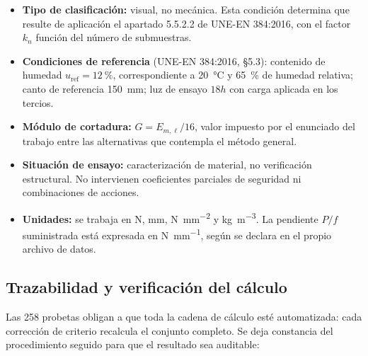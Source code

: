\documentclass[11pt,a4paper]{article}
\newcommand{\Eml}{E_{m,\ell}}
\newcommand{\uref}{u_{\mathrm{ref}}}
\begin{document}
\begin{itemize}
  \item \textbf{Tipo de clasificación:} visual, no mecánica. Esta condición determina
        que resulte de aplicación el apartado 5.5.2.2 de UNE-EN 384:2016, con el factor
        $k_{n}$ función del número de submuestras.
  \item \textbf{Condiciones de referencia} (UNE-EN 384:2016, \S5.3): contenido de
        humedad $\uref = \SI{12}{\percent}$, correspondiente a \SI{20}{\celsius} y
        \SI{65}{\percent} de humedad relativa; canto de referencia
        \SI{150}{\milli\meter}; luz de ensayo $18h$ con carga aplicada en los tercios.
  \item \textbf{Módulo de cortadura:} $G = \Eml/16$, valor impuesto por el enunciado
        del trabajo entre las alternativas que contempla el método general.
  \item \textbf{Situación de ensayo:} caracterización de material, no verificación
        estructural. No intervienen coeficientes parciales de seguridad ni
        combinaciones de acciones.
  \item \textbf{Unidades:} se trabaja en \si{\newton}, \si{\milli\meter},
        \si{\newton\per\square\milli\meter} y \si{\kilo\gram\per\cubic\meter}. La
        pendiente $P/f$ suministrada está expresada en
        \si{\newton\per\milli\meter}, según se declara en el propio archivo de datos.
\end{itemize}

\subsection{Trazabilidad y verificación del cálculo}

Las \num{258} probetas obligan a que toda la cadena de cálculo esté automatizada: cada
corrección de criterio recalcula el conjunto completo. Se deja constancia del
procedimiento seguido para que el resultado sea auditable:
\end{document}
